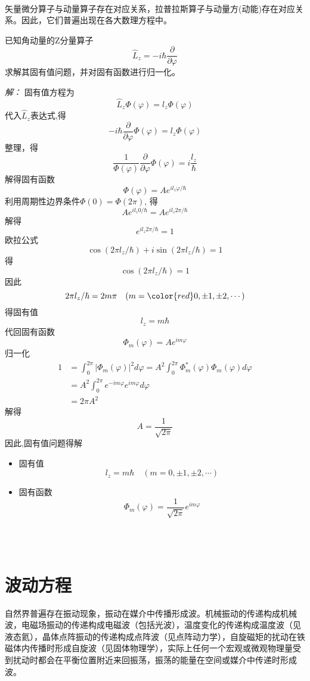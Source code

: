 ~\\
\begin{hint}
	矢量微分算子与动量算子存在对应关系，拉普拉斯算子与动量方(动能)存在对应关系。因此，它们普遍出现在各大数理方程中。
\end{hint}
\begin{example}
已知角动量的Z分量算子
  \begin{equation*}
	\hat{L}_z= -i \hbar \frac{\partial }{\partial\varphi }
\end{equation*}
求解其固有值问题，并对固有函数进行归一化。
\end{example}
\emph{解：}
固有值方程为
  \[\hat{L}_z \Phi(\varphi) = l_z \Phi(\varphi) \]
代入$\hat{L}_z$表达式,得
\[-i \hbar \frac{\partial }{\partial\varphi } \Phi(\varphi) = l_z \Phi(\varphi) \]
整理，得
\[ \frac{1}{\Phi(\varphi)}\frac{\partial }{\partial\varphi } \Phi(\varphi) =  i\dfrac{l_z}{\hbar} \]
解得固有函数
\[ \Phi(\varphi) = A e^{i l_z \varphi / \hbar} \]
利用周期性边界条件$ \Phi(0) = \Phi(2\pi) $, 得 
\[ A e^{i l_z 0 /\hbar} =  A e^{i l_z 2\pi / \hbar}  \]
解得$$e^{i l_z 2\pi / \hbar} =1 $$
欧拉公式
\[ \cos(2\pi l_z  / \hbar) + i \sin(2\pi l_z  / \hbar) =1 \]
得
\[\cos(2\pi l_z  / \hbar) =1\]
因此
\[ 2\pi l_z  / \hbar = 2m \pi \quad (m= {\color{red}0}, \pm 1, \pm 2, \cdots  ) \]
得固有值
\[l_z = m \hbar\]
代回固有函数
\[ \Phi_m (\varphi) = A e^{i m \varphi } \]
归一化
\[
\begin{aligned}
	1 &= \int_{0}^{2\pi} |\Phi_m (\varphi)|^2 d \varphi = A^2 \int_{0}^{2\pi} \Phi_m^* (\varphi) \Phi_m (\varphi) d \varphi \\
	&= A^2 \int_{0}^{2\pi} e^{-i m \varphi } e^{i m \varphi } d \varphi \\
	&= 2\pi A^2
\end{aligned} 
 \]
解得
\[ A = \frac{1}{\sqrt{2\pi} }\]
因此,固有值问题得解 \\
\begin{itemize}
	\item 固有值 
	\[l_z = m \hbar \quad (m=0, \pm 1, \pm 2, \cdots  )  \]
	\item 固有函数 
	\[ \Phi_m (\varphi) = \frac{1}{\sqrt{2\pi} } e^{i m \varphi } \]
\end{itemize}


~~\\ 
 ~~\\ 


\section{波动方程}
自然界普遍存在振动现象，振动在媒介中传播形成波。机械振动的传递构成机械波，电磁场振动的传递构成电磁波（包括光波），温度变化的传递构成温度波（见液态氦），晶体点阵振动的传递构成点阵波（见点阵动力学），自旋磁矩的扰动在铁磁体内传播时形成自旋波（见固体物理学），实际上任何一个宏观或微观物理量受到扰动时都会在平衡位置附近来回振荡，振荡的能量在空间或媒介中传递时形成波。

